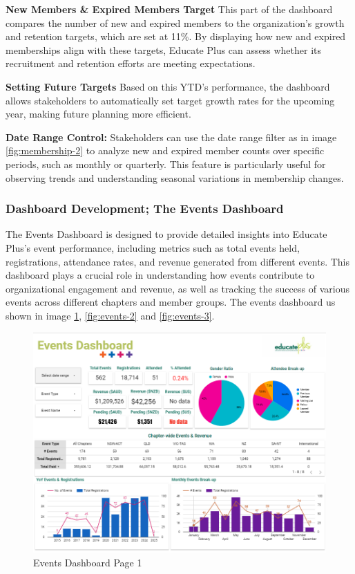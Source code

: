 \documentclass[11pt,a4paper,]{article}
\begin{document}
\textbf{New Members \& Expired Members Target}
This part of the dashboard compares the number of new and expired members to the organization's growth and retention targets, which are set at 11\%. By displaying how new and expired memberships align with these targets, Educate Plus can assess whether its recruitment and retention efforts are meeting expectations.

\textbf{Setting Future Targets}
Based on this YTD's performance, the dashboard allows stakeholders to automatically set target growth rates for the upcoming year, making future planning more efficient.

\textbf{Date Range Control:}
Stakeholders can use the date range filter as in image \ref{fig:membership-2} to analyze new and expired member counts over specific periods, such as monthly or quarterly. This feature is particularly useful for observing trends and understanding seasonal variations in membership changes.

\subsubsection{Dashboard Development; The Events Dashboard}\label{dashboard-development-the-events-dashboard}

The Events Dashboard is designed to provide detailed insights into Educate Plus's event performance, including metrics such as total events held, registrations, attendance rates, and revenue generated from different events. This dashboard plays a crucial role in understanding how events contribute to organizational engagement and revenue, as well as tracking the success of various events across different chapters and member groups. The events dashboard us shown in image \ref{fig:events-1}, \ref{fig:events-2} and \ref{fig:events-3}.

\begin{figure}[H]

{\centering \includegraphics[width=0.9\linewidth]{Images/events_dashboard_page_1} 

}

\caption{Events Dashboard Page 1}\label{fig:events-1}
\end{figure}
\end{document}
